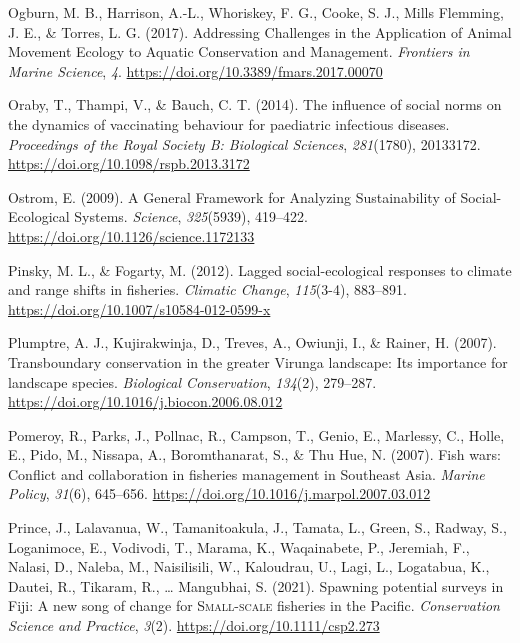 \documentclass[
  12pt,
]{article}
\newlength{\cslhangindent}
\newlength{\cslentryspacingunit} %
\newenvironment{CSLReferences}[2] %
 {%
  \setlength{\parindent}{0pt}
  \ifodd #1
  \let\oldpar\par
  \def\par{\hangindent=\cslhangindent\oldpar}
  \fi
  \setlength{\parskip}{#2\cslentryspacingunit}
 }%
 {}
\begin{document}
\begin{CSLReferences}{1}{2}
\leavevmode{}%
Ogburn, M. B., Harrison, A.-L., Whoriskey, F. G., Cooke, S. J., Mills Flemming, J. E., \& Torres, L. G. (2017). Addressing {Challenges} in the {Application} of {Animal Movement Ecology} to {Aquatic Conservation} and {Management}. \emph{Frontiers in Marine Science}, \emph{4}. \url{https://doi.org/10.3389/fmars.2017.00070}

\leavevmode{}%
Oraby, T., Thampi, V., \& Bauch, C. T. (2014). The influence of social norms on the dynamics of vaccinating behaviour for paediatric infectious diseases. \emph{Proceedings of the Royal Society B: Biological Sciences}, \emph{281}(1780), 20133172. \url{https://doi.org/10.1098/rspb.2013.3172}

\leavevmode{}%
Ostrom, E. (2009). A {General Framework} for {Analyzing Sustainability} of {Social-Ecological Systems}. \emph{Science}, \emph{325}(5939), 419--422. \url{https://doi.org/10.1126/science.1172133}

\leavevmode{}%
Pinsky, M. L., \& Fogarty, M. (2012). Lagged social-ecological responses to climate and range shifts in fisheries. \emph{Climatic Change}, \emph{115}(3-4), 883--891. \url{https://doi.org/10.1007/s10584-012-0599-x}

\leavevmode{}%
Plumptre, A. J., Kujirakwinja, D., Treves, A., Owiunji, I., \& Rainer, H. (2007). Transboundary conservation in the greater {Virunga} landscape: {Its} importance for landscape species. \emph{Biological Conservation}, \emph{134}(2), 279--287. \url{https://doi.org/10.1016/j.biocon.2006.08.012}

\leavevmode{}%
Pomeroy, R., Parks, J., Pollnac, R., Campson, T., Genio, E., Marlessy, C., Holle, E., Pido, M., Nissapa, A., Boromthanarat, S., \& Thu Hue, N. (2007). Fish wars: {Conflict} and collaboration in fisheries management in {Southeast Asia}. \emph{Marine Policy}, \emph{31}(6), 645--656. \url{https://doi.org/10.1016/j.marpol.2007.03.012}

\leavevmode{}%
Prince, J., Lalavanua, W., Tamanitoakula, J., Tamata, L., Green, S., Radway, S., Loganimoce, E., Vodivodi, T., Marama, K., Waqainabete, P., Jeremiah, F., Nalasi, D., Naleba, M., Naisilisili, W., Kaloudrau, U., Lagi, L., Logatabua, K., Dautei, R., Tikaram, R., \ldots{} Mangubhai, S. (2021). Spawning potential surveys in {Fiji}: {A} new song of change for {\textsc{Small-scale}} fisheries in the {Pacific}. \emph{Conservation Science and Practice}, \emph{3}(2). \url{https://doi.org/10.1111/csp2.273}


\end{CSLReferences}
\end{document}
